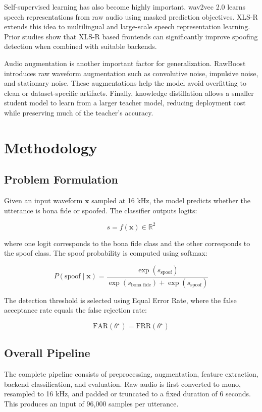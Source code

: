 \documentclass[sigconf]{acmart}
\begin{document}
Self-supervised learning has also become highly important. wav2vec 2.0 learns speech representations from raw audio using masked prediction objectives. XLS-R extends this idea to multilingual and large-scale speech representation learning. Prior studies show that XLS-R based frontends can significantly improve spoofing detection when combined with suitable backends.

Audio augmentation is another important factor for generalization. RawBoost introduces raw waveform augmentation such as convolutive noise, impulsive noise, and stationary noise. These augmentations help the model avoid overfitting to clean or dataset-specific artifacts. Finally, knowledge distillation allows a smaller student model to learn from a larger teacher model, reducing deployment cost while preserving much of the teacher's accuracy.

\section{Methodology}

\subsection{Problem Formulation}

Given an input waveform $\mathbf{x}$ sampled at 16 kHz, the model predicts whether the utterance is bona fide or spoofed. The classifier outputs logits:

\[
s = f(\mathbf{x}) \in \mathbb{R}^{2}
\]

where one logit corresponds to the bona fide class and the other corresponds to the spoof class. The spoof probability is computed using softmax:

\[
P(\text{spoof} \mid \mathbf{x}) =
\frac{\exp(s_{\text{spoof}})}
{\exp(s_{\text{bona fide}}) + \exp(s_{\text{spoof}})}
\]

The detection threshold is selected using Equal Error Rate, where the false acceptance rate equals the false rejection rate:

\[
\text{FAR}(\theta^\star) = \text{FRR}(\theta^\star)
\]

\subsection{Overall Pipeline}

The complete pipeline consists of preprocessing, augmentation, feature extraction, backend classification, and evaluation. Raw audio is first converted to mono, resampled to 16 kHz, and padded or truncated to a fixed duration of 6 seconds. This produces an input of 96,000 samples per utterance.
\end{document}
